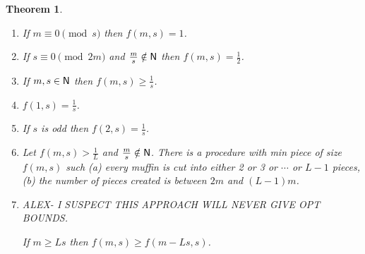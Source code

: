 \documentclass[12pt]{article}
\newcommand{\nat}{{\sf N}}
\newtheorem{theoremfoo}{Theorem}[section] %
\newenvironment{theorem}{\pagebreak[1]\begin{theoremfoo}}{\end{theoremfoo}}
\begin{document}
\begin{theorem}\label{th:easy}~
\begin{enumerate}
\item
If $m\equiv 0 \pmod s$ then $f(m,s)=1$.
\item
If $s\equiv 0\pmod {2m}$ and $\frac{m}{s}\notin\nat$ then $f(m,s)=\frac{1}{2}$.
\item
If $m,s\in\nat$ then $f(m,s)\ge \frac{1}{s}$.
\item
$f(1,s)=\frac{1}{s}$.
\item
If $s$ is odd then $f(2,s)=\frac{1}{s}$.
\item
Let $f(m,s)>\frac{1}{L}$ and $\frac{m}{s}\notin\nat$.
There is a procedure with min piece of size $f(m,s)$ such 
(a) every muffin is cut into either 2 or 3 or $\cdots$ or $L-1$ pieces, (b) the number of pieces created
is between $2m$ and $(L-1)m$.
\item
ALEX- I SUSPECT THIS APPROACH WILL NEVER GIVE OPT BOUNDS.

If $m\ge Ls$ then $f(m,s) \ge f(m-Ls,s)$.
\end{enumerate}
\end{theorem}
\end{document}
